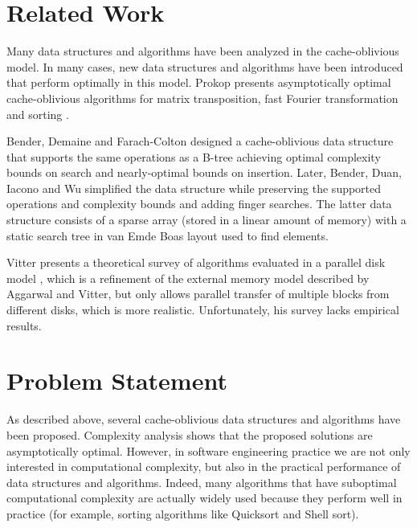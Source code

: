 \documentclass{acm_proc_article-sp}
\begin{document}
\section{Related Work}
Many data structures and algorithms have been analyzed in the cache-oblivious model. In many cases, new data structures and algorithms have been introduced that perform optimally in this model. Prokop presents asymptotically optimal cache-oblivious algorithms for matrix transposition, fast Fourier transformation and sorting \cite{prokop1999coa}.

Bender, Demaine and Farach-Colton designed a cache-oblivious data structure that supports the same operations as a B-tree \cite{bender2005cob} achieving optimal complexity bounds on search and nearly-optimal bounds on insertion. Later, Bender, Duan, Iacono and Wu simplified the data structure \cite{bender2004lpc} while preserving the supported operations and complexity bounds and adding finger searches. The latter data structure consists of a sparse array (stored in a linear amount of memory) with a static search tree in van Emde Boas layout used to find elements.

Vitter presents a theoretical survey of algorithms evaluated in a parallel disk model \cite{vitter2001ema}, which is a refinement of the external memory model described by Aggarwal and Vitter, but only allows parallel transfer of multiple blocks from different disks, which is more realistic. Unfortunately, his survey lacks empirical results.



\section{Problem Statement}
As described above, several cache-oblivious data structures and algorithms have been proposed. Complexity analysis shows that the proposed solutions are asymptotically optimal. However, in software engineering practice we are not only interested in computational complexity, but also in the practical performance of data structures and algorithms. Indeed, many algorithms that have suboptimal computational complexity are actually widely used because they perform well in practice (for example, sorting algorithms like Quicksort and Shell sort).
\end{document}
